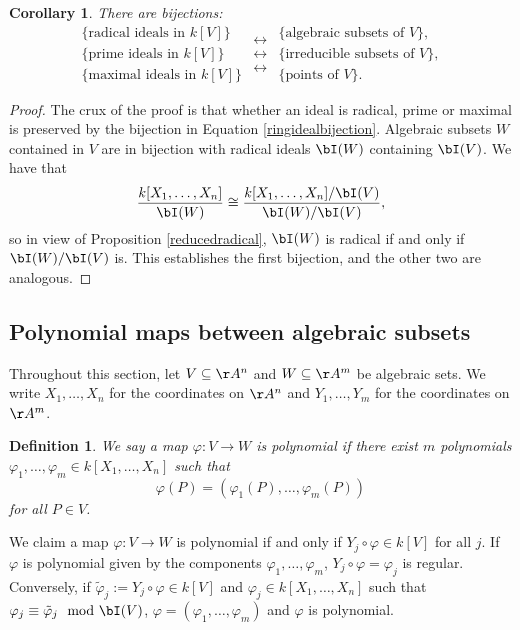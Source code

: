 \documentclass[12pt]{amsart}
\theoremstyle{plain}
\newtheorem{definition}[theorem]{Definition}
\newtheorem{corollary}[theorem]{Corollary}
\begin{document}
\begin{corollary}
There are bijections:
$$
\begin{array}{c}
\{\text{radical ideals in } k[V] \} \\
\{\text{prime ideals in } k[V] \} \\
\{\text{maximal ideals in } k[V] \} 
\end{array}
\begin{array}{c}
\longleftrightarrow \\
\longleftrightarrow \\
\longleftrightarrow  
\end{array}
\begin{array}{c}
\{\text{algebraic subsets of } V \}, \\
\{\text{irreducible subsets of } V\}, \\
\{\text{points of } V\} .
\end{array}
$$
\end{corollary}
\begin{proof}
The crux of the proof is that whether an ideal is radical, prime or maximal is preserved by the bijection in Equation \ref{ringidealbijection}.
Algebraic subsets $W$ contained in $V$ are in bijection with radical ideals $\bI(W)$ containing $\bI(V)$.
We have that
$$\frac{k[X_1, \ldots, X_n]}{\bI(W)} \cong \frac{k[X_1, \ldots, X_n]/\bI(V)}{\bI(W)/\bI(V)},$$
so in view of Proposition \ref{reducedradical}, $\bI(W)$ is radical if and only if $\bI(W)/\bI(V)$ is.
This establishes the first bijection, and the other two are analogous.
\end{proof}

\subsection{Polynomial maps between algebraic subsets}
Throughout this section, let $V \subseteq \AA^n$ and $W \subseteq \AA^m$ be algebraic sets.
We write $X_1, \ldots, X_n$ for the coordinates on $\AA^n$ and $Y_1, \ldots, Y_m$ for the coordinates on $\AA^m$.

\begin{definition}
We say a map $\varphi : V \to W$ is polynomial if there exist $m$ polynomials $\varphi_1, \ldots, \varphi_m \in k[X_1, \ldots, X_n]$ such that
$$\varphi(P) = (\varphi_1(P), \ldots, \varphi_m(P))$$
for all $P \in V$.
\end{definition}

We claim a map $\varphi: V \to W$ is polynomial if and only if $Y_j \circ \varphi \in k[V]$ for all $j$.
If $\varphi$ is polynomial given by the components $\varphi_1, \ldots, \varphi_m$, $Y_j \circ \varphi = \varphi_j$ is regular.
Conversely, if $\tilde \varphi_j := Y_j \circ \varphi \in k[V]$ and $\varphi_j \in k[X_1, \ldots, X_n]$ such that $\varphi_j \equiv \tilde \varphi_j \mod \bI(V)$, $\varphi = (\varphi_1, \ldots, \varphi_m)$ and $\varphi$ is polynomial.
\end{document}
